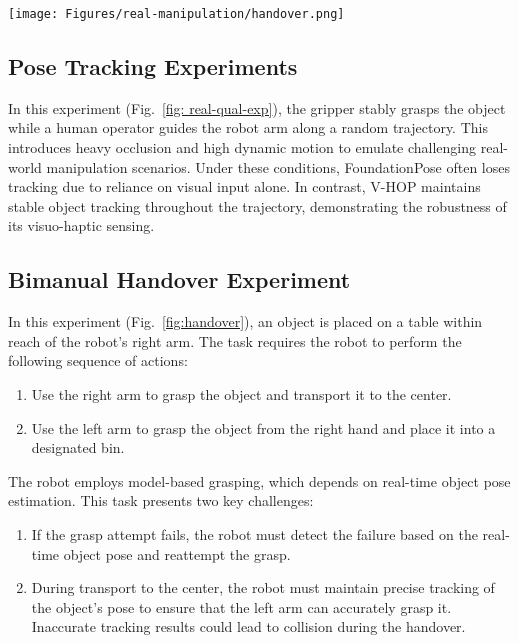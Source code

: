 \documentclass[11pt, a4paper, logo, twocolumn]{brown}
\newcommand{\shortname}{V-HOP\xspace}
\begin{document}
\begin{figure*}[t!]
    \centering
    \texttt{[image: Figures/real-manipulation/handover.png]}
    \caption{
    \textbf{Bimanual handover experiment.}
    In this experiment, the robot performs bimanual manipulation to transport the target object to the box.
    \shortname integrates visual and haptic inputs to accurately track the pose of the in-hand object in real-time, resulting in stable handover performance.
    Results on more objects can be found in the appendix.
    }
    \label{fig:handover}
\end{figure*}

\subsection{Pose Tracking Experiments}
In this experiment (Fig.~\ref{fig: real-qual-exp}), the gripper stably grasps the object while a human operator guides the robot arm along a random trajectory.
This introduces heavy occlusion and high dynamic motion to emulate challenging real-world manipulation scenarios.
Under these conditions, FoundationPose often loses tracking due to reliance on visual input alone. 
In contrast, \shortname maintains stable object tracking throughout the trajectory, demonstrating the robustness of its visuo-haptic sensing.


\subsection{Bimanual Handover Experiment}

In this experiment (Fig.~\ref{fig:handover}), an object is placed on a table within reach of the robot's right arm.
The task requires the robot to perform the following sequence of actions:
\begin{enumerate}
    \item Use the right arm to grasp the object and transport it to the center.
    \item Use the left arm to grasp the object from the right hand and place it into a designated bin.
\end{enumerate}
The robot employs model-based grasping, which depends on real-time object pose estimation.
This task presents two key challenges:
\begin{enumerate}
    \item If the grasp attempt fails, the robot must detect the failure based on the real-time object pose and reattempt the grasp.
    \item During transport to the center, the robot must maintain precise tracking of the object’s pose to ensure that the left arm can accurately grasp it. 
    Inaccurate tracking results could lead to collision during the handover.
\end{enumerate}
\end{document}

